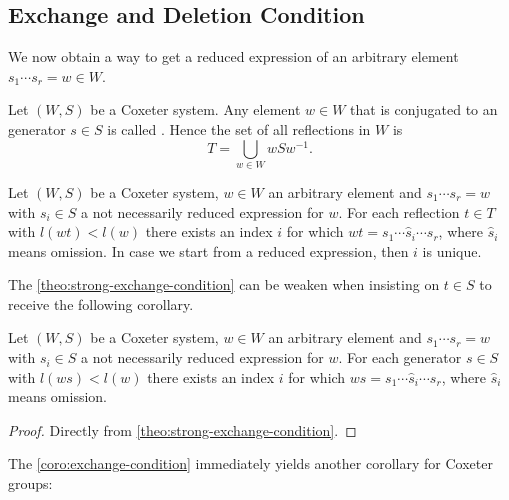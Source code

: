\subsection{Exchange and Deletion Condition}
\label{sec:coxeter-groups-exchange-deletion-condition}

We now obtain a way to get a reduced expression of an arbitrary element $s_1 \cdots s_r = w \in W$.

\begin{defi}
	Let $(W,S)$ be a Coxeter system. Any element $w \in W$ that is conjugated to an generator $s \in S$ is called . Hence the set of all reflections in $W$ is
	$$ T = \bigcup_{w \in W} wSw^{-1}. $$
\end{defi}

\begin{theo}
	Let $(W,S)$ be a Coxeter system, $w \in W$ an arbitrary element and ${s_1 \cdots s_r = w}$ with $s_i \in S$ a not necessarily reduced expression for $w$. For each reflection $t \in T$ with $l(wt) < l(w)$ there exists an index $i$ for which $wt = s_1 \cdots \hat s_i \cdots s_r$, where $\hat s_i$ means omission. In case we start from a reduced expression, then $i$ is unique.
\end{theo}

The \ref{theo:strong-exchange-condition} can be weaken when insisting on $t \in S$ to receive the following corollary.

\begin{coro}
	Let $(W,S)$ be a Coxeter system, $w \in W$ an arbitrary element and ${s_1 \cdots s_r = w}$ with $s_i \in S$ a not necessarily reduced expression for $w$. For each generator $s \in S$ with $l(ws) < l(w)$ there exists an index $i$ for which $ws = s_1 \cdots \hat s_i \cdots s_r$, where $\hat s_i$ means omission.

	\begin{proof}
		Directly from \ref{theo:strong-exchange-condition}.
	\end{proof}
\end{coro}

The \ref{coro:exchange-condition} immediately yields another corollary for Coxeter groups:

